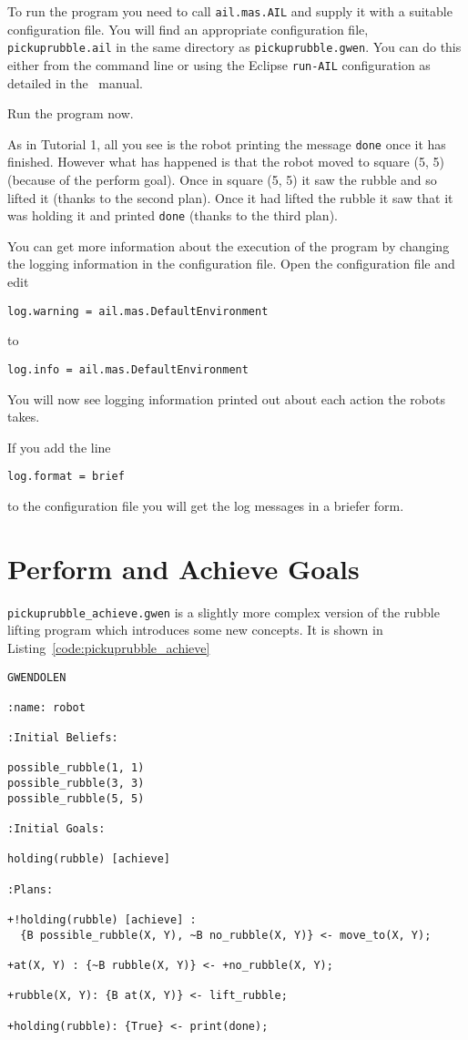 \documentclass[a4]{article}
\begin{document}
To run the program you need to call \texttt{ail.mas.AIL} and supply it with a suitable configuration file.  You will find an appropriate configuration file, \texttt{pickuprubble.ail} in the same directory as \texttt{pickuprubble.gwen}.  You can do this either from the command line or using the Eclipse \texttt{run-AIL} configuration as detailed in the \mcapl\ manual.

Run the program now.

As in Tutorial 1, all you see is the robot printing the message \lstinline{done} once it has finished.  However what has happened is that the robot moved to square (5, 5) (because of the perform goal).  Once in square (5, 5) it saw the rubble and so lifted it (thanks to the second plan).  Once it had lifted the rubble it saw that it was holding it and printed \lstinline{done} (thanks to the third plan).

You can get more information about the execution of the program by changing the logging information in the configuration file.  Open the configuration file and edit
\begin{verbatim}
log.warning = ail.mas.DefaultEnvironment
\end{verbatim}
to
\begin{verbatim}
log.info = ail.mas.DefaultEnvironment
\end{verbatim}
You will now see logging information printed out about each action the robots takes.

If you add the line
\begin{verbatim}
log.format = brief
\end{verbatim}
to the configuration file you will get the log messages in a briefer form.

\section{Perform and Achieve Goals}
\lstinline{pickuprubble_achieve.gwen} is a slightly more complex version of the rubble lifting program which introduces some new concepts.  It is shown in Listing~\ref{code:pickuprubble_achieve}

\begin{lstlisting}[float,caption=Pick Up Rubble (Achievement Goals),basicstyle=\sffamily,style=easslisting,language=Gwendolen,label=code:pickuprubble_achieve]
GWENDOLEN

:name: robot

:Initial Beliefs:

possible_rubble(1, 1)
possible_rubble(3, 3)
possible_rubble(5, 5)

:Initial Goals:

holding(rubble) [achieve]

:Plans:

+!holding(rubble) [achieve] : 
  {B possible_rubble(X, Y), ~B no_rubble(X, Y)} <- move_to(X, Y);

+at(X, Y) : {~B rubble(X, Y)} <- +no_rubble(X, Y);

+rubble(X, Y): {B at(X, Y)} <- lift_rubble;

+holding(rubble): {True} <- print(done);
\end{lstlisting}
\end{document}
